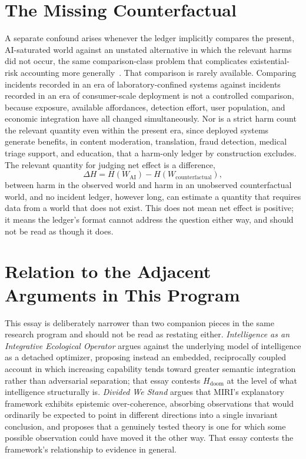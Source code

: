 \documentclass[11pt]{article}
\begin{document}
\section{The Missing Counterfactual}

A separate confound arises whenever the ledger implicitly compares the present, AI-saturated world against an unstated alternative in which the relevant harms did not occur, the same comparison-class problem that complicates existential-risk accounting more generally~\cite{bostrom2013,ord2020}. That comparison is rarely available. Comparing incidents recorded in an era of laboratory-confined systems against incidents recorded in an era of consumer-scale deployment is not a controlled comparison, because exposure, available affordances, detection effort, user population, and economic integration have all changed simultaneously. Nor is a strict harm count the relevant quantity even within the present era, since deployed systems generate benefits, in content moderation, translation, fraud detection, medical triage support, and education, that a harm-only ledger by construction excludes. The relevant quantity for judging net effect is a difference,
\[
\Delta H = H(W_{\text{AI}}) - H(W_{\text{counterfactual}}),
\]
between harm in the observed world and harm in an unobserved counterfactual world, and no incident ledger, however long, can estimate a quantity that requires data from a world that does not exist. This does not mean net effect is positive; it means the ledger's format cannot address the question either way, and should not be read as though it does.

\section{Relation to the Adjacent Arguments in This Program}

This essay is deliberately narrower than two companion pieces in the same research program and should not be read as restating either. \emph{Intelligence as an Integrative Ecological Operator} argues against the underlying model of intelligence as a detached optimizer, proposing instead an embedded, reciprocally coupled account in which increasing capability tends toward greater semantic integration rather than adversarial separation; that essay contests $H_{\text{doom}}$ at the level of what intelligence structurally is. \emph{Divided We Stand} argues that MIRI's explanatory framework exhibits epistemic over-coherence, absorbing observations that would ordinarily be expected to point in different directions into a single invariant conclusion, and proposes that a genuinely tested theory is one for which some possible observation could have moved it the other way. That essay contests the framework's relationship to evidence in general.
\end{document}
